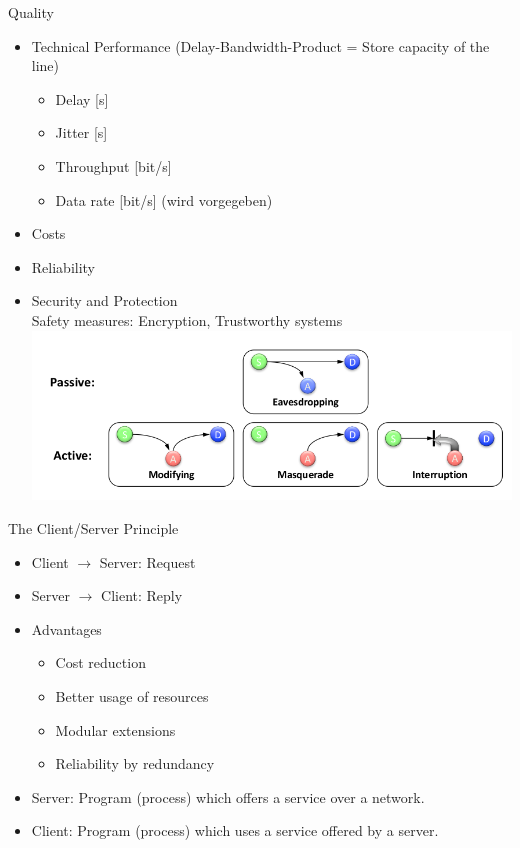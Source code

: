 \documentclass[11pt,ngerman]{article}
\begin{document}
Quality\\
\begin{itemize}
	\item Technical	Performance (Delay-Bandwidth-Product	=	
Store	capacity of	the	line)
	\begin{itemize}
		\item Delay	[s]
		\item Jitter	[s]
		\item Throughput	[bit/s]
		\item Data	rate	[bit/s] (wird vorgegeben)
	\end{itemize}
	\item Costs
	\item Reliability
	\item Security	and	Protection\\
		Safety measures: Encryption, Trustworthy	systems	\\
	\includegraphics[width=5in]{images/Selection_005.png}
\end{itemize}


The	Client/Server	Principle
\begin{itemize}
	\item Client $\rightarrow$ Server: Request
	\item Server $\rightarrow$ Client: Reply 
\end{itemize}
\begin{itemize}
	\item Advantages
	\begin{itemize}  
	\item Cost	reduction
	\item Better	usage	of	resources
	\item Modular	extensions
	\item Reliability	by	redundancy
	 \end{itemize}
	\item Server: Program	(process)	which	offers	a	service	over	a	network.	
	\item Client: Program	(process)	which	uses	a	service	offered	by	a	server.
\end{itemize}
\end{document}
